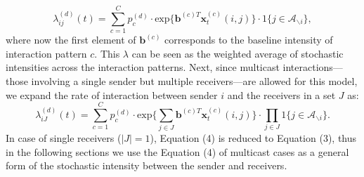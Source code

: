 \documentclass[a4paper]{article}
\begin{document}
\begin{equation}
\lambda^{(d)}_{ij}(t)= \sum\limits_{c=1}^{C} p^{(d)}_c\cdot\mbox{exp}\Big\{\boldsymbol{b}^{(c)T}\boldsymbol{x}^{(c)}_t(i, j)\Big\}\cdot 1\{j \in \mathcal{A}_{\backslash i}\},
\end{equation}
where now the first element of $\boldsymbol{b}^{(c)}$ corresponds to the baseline intensity of interaction pattern $c$. This $\lambda$ can be seen as the weighted average of stochastic intensities across the interaction patterns. Next, since multicast interactions—those involving a single sender but multiple
receivers—are allowed for this model, we expand the rate of interaction between sender $i$ and the receivers in a set $J$ as:
\begin{equation}
\lambda^{(d)}_{iJ}(t)= \sum\limits_{c=1}^{C} p^{(d)}_c\cdot\mbox{exp}\Big\{\sum\limits_{j \in J} \boldsymbol{b}^{(c)T}\boldsymbol{x}^{(c)}_t(i, j)\Big\}\cdot \prod\limits_{j \in J}1\{j \in \mathcal{A}_{\backslash i}\}.
\end{equation}
In case of single receivers ($|J|=1$),  Equation (4) is reduced to Equation (3), thus in the following sections we use the Equation (4) of multicast cases as a general form of the stochastic intensity between the sender and receivers.
\end{document}
